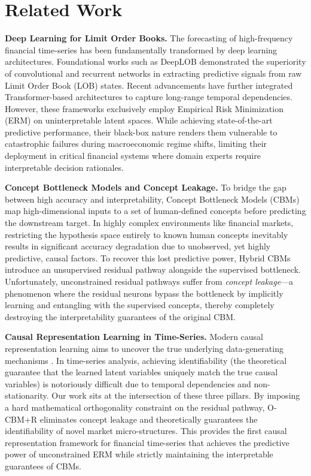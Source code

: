 \documentclass[twoside,11pt]{article}
\begin{document}
\section{Related Work}
\textbf{Deep Learning for Limit Order Books.} The forecasting of high-frequency financial time-series has been fundamentally transformed by deep learning architectures. Foundational works such as DeepLOB \citep{Sirignano2019} demonstrated the superiority of convolutional and recurrent networks in extracting predictive signals from raw Limit Order Book (LOB) states. Recent advancements have further integrated Transformer-based architectures to capture long-range temporal dependencies. However, these frameworks exclusively employ Empirical Risk Minimization (ERM) on uninterpretable latent spaces. While achieving state-of-the-art predictive performance, their black-box nature renders them vulnerable to catastrophic failures during macroeconomic regime shifts, limiting their deployment in critical financial systems where domain experts require interpretable decision rationales.

\textbf{Concept Bottleneck Models and Concept Leakage.} To bridge the gap between high accuracy and interpretability, Concept Bottleneck Models (CBMs) \citep{Koh2020} map high-dimensional inputs to a set of human-defined concepts before predicting the downstream target. In highly complex environments like financial markets, restricting the hypothesis space entirely to known human concepts inevitably results in significant accuracy degradation due to unobserved, yet highly predictive, causal factors. To recover this lost predictive power, Hybrid CBMs \citep{Liu202520179} introduce an unsupervised residual pathway alongside the supervised bottleneck. Unfortunately, unconstrained residual pathways suffer from \textit{concept leakage}---a phenomenon where the residual neurons bypass the bottleneck by implicitly learning and entangling with the supervised concepts, thereby completely destroying the interpretability guarantees of the original CBM.

\textbf{Causal Representation Learning in Time-Series.} Modern causal representation learning aims to uncover the true underlying data-generating mechanisms \citep{Scholkopf2021}. In time-series analysis, achieving identifiability (the theoretical guarantee that the learned latent variables uniquely match the true causal variables) is notoriously difficult due to temporal dependencies and non-stationarity. Our work sits at the intersection of these three pillars. By imposing a hard mathematical orthogonality constraint on the residual pathway, O-CBM+R eliminates concept leakage and theoretically guarantees the identifiability of novel market micro-structures. This provides the first causal representation framework for financial time-series that achieves the predictive power of unconstrained ERM while strictly maintaining the interpretable guarantees of CBMs.
\end{document}

